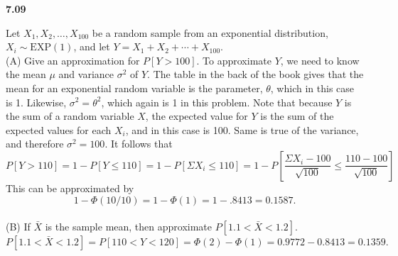 {\bf 7.09}

Let $X_1, X_2, \ldots, X_{100}$ be a random sample from an exponential distribution, $X_i \sim \text{EXP}(1)$, and let $Y = X_1 + X_2 + \cdots + X_{100}$.\\
(A)	Give an approximation for $P[Y > 100]$.
To approximate $Y$, we need to know the mean $\mu$ and variance $\sigma^2$ of $Y$. The table in the back of the book gives that the mean for an exponential random variable is the parameter, $\theta$, which in this case is 1. Likewise, $\sigma^2 = \theta^2$, which again is 1 in this problem. Note that because $Y$ is the sum of a random variable $X$, the expected value for $Y$ is the sum of the expected values for each $X_i$, and in this case is 100. Same is true of the variance, and therefore $\sigma^2 = 100$. It follows that 
$$P[Y > 110] = 1 - P[Y \leq 110] = 1 - P[\Sigma X_i \leq 110] = 1 - P[\frac{\Sigma X_i - 100}{\sqrt{100}} \leq \frac{110 - 100}{\sqrt{100}}]$$
This can be approximated by $$1 - \Phi (10/10) = 1 - \Phi(1) = 1 - .8413 = 0.1587.$$\\
(B) If $\bar{X}$ is the sample mean, then approximate $P[1.1<\bar{X}<1.2]$.
$P[1.1<\bar{X}<1.2]=P[110<Y<120]=\Phi(2)-\Phi(1)=0.9772-0.8413=0.1359.$\\
